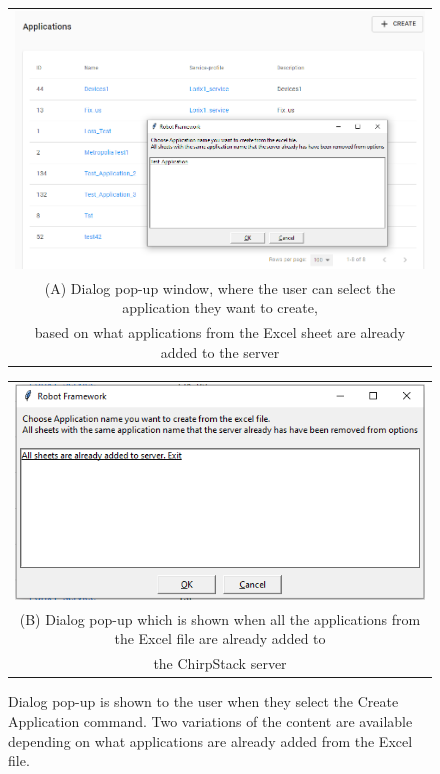 \clearpage

\begin{figure}[H]
  \centering
  \begin{tabular}{@{}c@{}}
    \includegraphics[width=\textwidth]{illustration/create_new_application_choose_application_dialog.PNG} \\[\abovecaptionskip]
    \small (A) Dialog pop-up window, where the user can select the application they want to create, \\ based on what applications from the Excel sheet are already added to the server
  \end{tabular}

  \vspace{\floatsep}

  \begin{tabular}{@{}c@{}}
    \includegraphics[width=12cm]{illustration/all_sheets_are_already_added.PNG} \\[\abovecaptionskip]
    \small (B) Dialog pop-up which is shown when all the applications from the Excel file are already added to \\ the ChirpStack server
  \end{tabular}

  \caption{Dialog pop-up is shown to the user when they select the Create Application command. Two variations of the content are available depending on what applications are already added from the Excel file.}\label{fig:new_application_select_application}
\end{figure}

